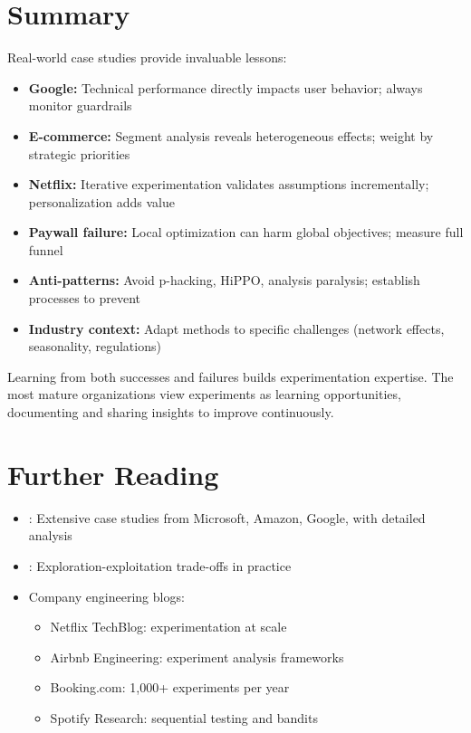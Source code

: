 \section{Summary}

Real-world case studies provide invaluable lessons:

\begin{itemize}
    \item \textbf{Google:} Technical performance directly impacts user behavior; always monitor guardrails

    \item \textbf{E-commerce:} Segment analysis reveals heterogeneous effects; weight by strategic priorities

    \item \textbf{Netflix:} Iterative experimentation validates assumptions incrementally; personalization adds value

    \item \textbf{Paywall failure:} Local optimization can harm global objectives; measure full funnel

    \item \textbf{Anti-patterns:} Avoid p-hacking, HiPPO, analysis paralysis; establish processes to prevent

    \item \textbf{Industry context:} Adapt methods to specific challenges (network effects, seasonality, regulations)
\end{itemize}

Learning from both successes and failures builds experimentation expertise. The most mature organizations view experiments as learning opportunities, documenting and sharing insights to improve continuously.

\section{Further Reading}

\begin{itemize}
    \item \cite{kohavi2020trustworthy}: Extensive case studies from Microsoft, Amazon, Google, with detailed analysis
    \item \cite{christian2016algorithms}: Exploration-exploitation trade-offs in practice
    \item Company engineering blogs:
    \begin{itemize}
        \item Netflix TechBlog: experimentation at scale
        \item Airbnb Engineering: experiment analysis frameworks
        \item Booking.com: 1,000+ experiments per year
        \item Spotify Research: sequential testing and bandits
    \end{itemize}
\end{itemize}


